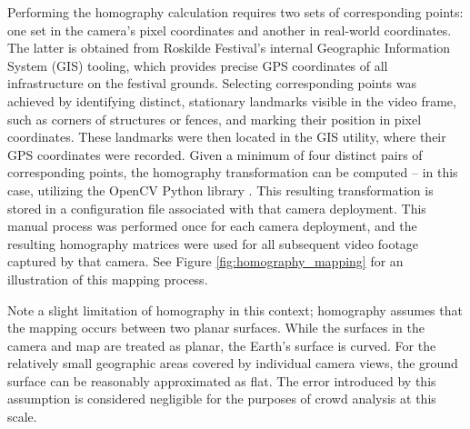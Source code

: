 Performing the homography calculation requires two sets of corresponding points: one set in the camera's pixel coordinates and another in real-world coordinates. The latter is obtained from Roskilde Festival's internal Geographic Information System (GIS) tooling, which provides precise GPS coordinates of all infrastructure on the festival grounds. Selecting corresponding points was achieved by identifying distinct, stationary landmarks visible in the video frame, such as corners of structures or fences, and marking their position in pixel coordinates. These landmarks were then located in the GIS utility, where their GPS coordinates were recorded. Given a minimum of four distinct pairs of corresponding points, the homography transformation can be computed -- in this case, utilizing the OpenCV Python library \cite{opencv}. This resulting transformation is stored in a configuration file associated with that camera deployment. This manual process was performed once for each camera deployment, and the resulting homography matrices were used for all subsequent video footage captured by that camera. See Figure \ref{fig:homography_mapping} for an illustration of this mapping process.

Note a slight limitation of homography in this context; homography assumes that the mapping occurs between two planar surfaces. While the surfaces in the camera and map are treated as planar, the Earth's surface is curved. For the relatively small geographic areas covered by individual camera views, the ground surface can be reasonably approximated as flat. The error introduced by this assumption is considered negligible for the purposes of crowd analysis at this scale.

